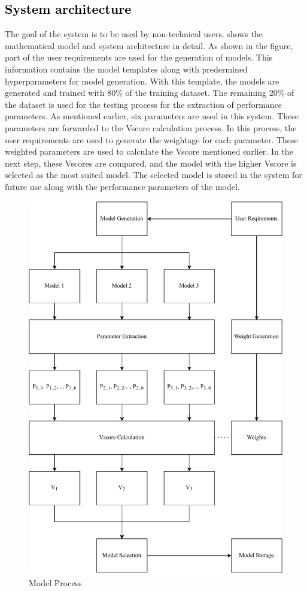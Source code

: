 \documentclass[a4paper,fleqn]{cas-dc}
\newcommand{\responsemod}{\color{black}}
\newcommand{\responsemodsm}[1]{\textcolor{black}{#1}}
\newcommand{\subsectionb}[1]{\subsection{\responsemodsm{#1}}}
\begin{document}
\subsectionb{System architecture}\label{subsec:system_architecture}

{\responsemod
    The goal of the system is to be used by non-technical users.  shows the mathematical model and system architecture in detail. As shown in the figure, part of the user requirements are used for the generation of models. This information contains the model templates along with predermined hyperparameters for model generation. With this template, the models are generated and trained with 80\% of the training dataset. The remaining 20\% of the dataset is used for the testing process for the extraction of performance parameters. As mentioned earlier, six parameters are used in this system. These parameters are forwarded to the Vscore calculation process. In this process, the user requirements are used to generate the weightage for each parameter. These weighted parameters are used to calculate the Vscore mentioned earlier. In the next step, these Vscores are compared, and the model with the higher Vscore is selected as the most suited model. The selected model is stored in the system for future use along with the performance parameters of the model.
}

\begin{figure}[ht]
    \centering
    \includegraphics[width=1.6\columnwidth]{math_model_relaxed_flow.pdf}
    \caption{Model Process}
    \label{fig:model_process}
\end{figure}
\end{document}
